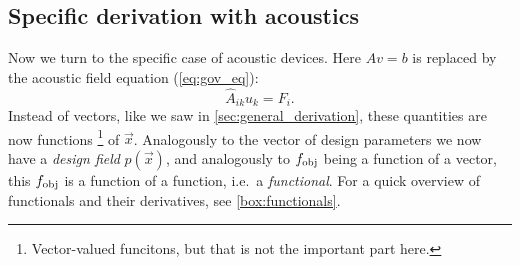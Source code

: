 \subsection{Specific derivation with acoustics}\label{sec:spec_der}

Now we turn to the specific case of acoustic devices.
Here $A v = b$ is replaced by the acoustic field equation (\cref{eq:gov_eq}):
\begin{equation}\label{eq:sim_eq}
	\hat A_{ik} u_k = F_i.
\end{equation}
Instead of vectors, like we saw in \cref{sec:general_derivation}, these quantities are now functions%
\footnote{%
	Vector-valued funcitons, but that is not the important part here.
}
of $\vec x$.
Analogously to the vector of design parameters we now have a \emph{design field}
$p(\vec x)$,
and analogously to $f_\text{obj}$ being a function of a vector, this $f_\text{obj}$ is a
function of a function, i.e.\ a \emph{functional}.
For a quick overview of functionals and their derivatives, see
\cref{box:functionals}.

